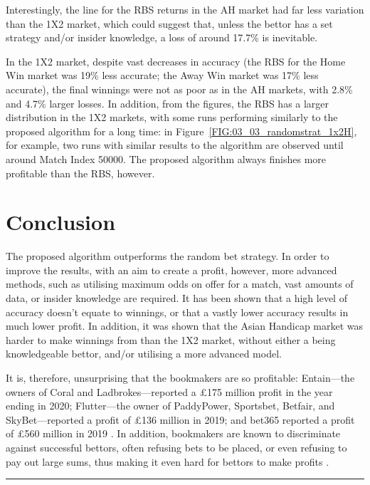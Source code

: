 \documentclass[a4paper,10pt]{report}
\begin{document}
Interestingly, the line for the RBS returns in the AH market had far less variation than the 1X2 market, which could suggest that, unless the bettor has a set strategy and/or insider knowledge, a loss of around 17.7\% is inevitable.

In the 1X2 market, despite vast decreases in accuracy (the RBS for the Home Win market was 19\% less accurate; the Away Win market was 17\% less accurate), the final winnings were not as poor as in the AH markets, with 2.8\% and 4.7\% larger losses. In addition, from the figures, the RBS has a larger distribution in the 1X2 markets, with some runs performing similarly to the proposed algorithm for a long time: in Figure~\ref{FIG:03_03_randomstrat_1x2H}, for example, two runs with similar results to the algorithm are observed until around Match Index 50000. The proposed algorithm always finishes more profitable than the RBS, however.

\section{Conclusion}\label{sec:modelconc}

The proposed algorithm outperforms the random bet strategy. In order to improve the results, with an aim to create a profit, however, more advanced methods, such as utilising maximum odds on offer for a match, vast amounts of data, or insider knowledge are required. It has been shown that a high level of accuracy doesn't equate to winnings, or that a vastly lower accuracy results in much lower profit. In addition, it was shown that the Asian Handicap market was harder to make winnings from than the 1X2 market, without either a being knowledgeable bettor, and/or utilising a more advanced model. 

It is, therefore, unsurprising that the bookmakers are so profitable: Entain---the owners of Coral and Ladbrokes---reported a £175 million profit in the year ending in 2020; Flutter---the owner of PaddyPower, Sportsbet, Betfair, and SkyBet---reported a profit of £136 million in 2019; and bet365 reported a profit of £560 million in 2019 \autocite{davies21, flutter, bet365revenue}. In addition, bookmakers are known to discriminate against successful bettors, often refusing bets to be placed, or even refusing to pay out large sums, thus making it even hard for bettors to make profits \autocite{symonds20, cave15, osborne15}.

\begin{center}\noindent\rule{0.5\textwidth}{0.6pt}\end{center}
\end{document}
